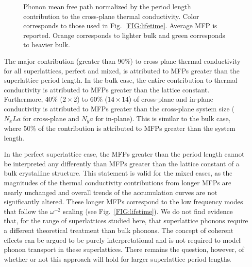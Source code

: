 \begin{figure}%
\begin{center}
\renewcommand{\figure}{Fig.}
\caption{Phonon mean free path normalized by the period length contribution to the cross-plane thermal conductivity. Color corresponds to those used in Fig.~\ref{FIG:lifetime}. Average MFP is reported. Orange corresponds to lighter bulk and green corresponds to heavier bulk.}
\label{FIG:MFP_cuml}
\end{center}
\end{figure}

The major contribution (greater than 90\%) to cross-plane thermal conductivity for all superlattices, perfect and mixed, is attributed to MFPs greater than the superlattice period length. In the bulk case, the entire contribution to thermal conductivity is attributed to MFPs greater than the lattice constant. Furthermore, 40\% ($2 \times 2 $) to 60\% ($14 \times 14$) of cross-plane and in-plane conductivity is attributed to MFPs greater than the cross-plane system size ($N_xLa$ for cross-plane and $N_ya$ for in-plane). This is similar to the bulk case, where 50\% of the contribution is attributed to MFPs greater than the system length.

In the perfect superlattice case, the MFPs greater than the period length cannot be interpreted any differently than MFPs greater than the lattice constant of a bulk crystalline structure. This statement is valid for the mixed cases, as the magnitudes of the thermal conductivity contributions from longer MFPs are nearly unchanged and overall trends of the accumulation curves are not significantly altered. These longer MFPs correspond to the low frequency modes that follow the $\omega^{-2}$ scaling (see Fig.~\ref{FIG:lifetime}). We do not find evidence that, for the range of superlattices studied here, that superlattice phonons require a different theoretical treatment than bulk phonons. The concept of coherent effects can be argued to be purely interpretational and is not required to model phonon transport in these superlattices. There remains the question, however, of whether or not this approach will hold for larger superlattice period lengths.



